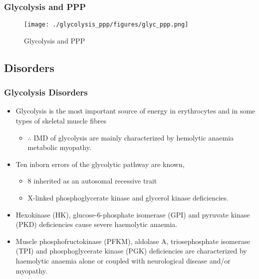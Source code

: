 \documentclass{scrartcl}
\begin{document}
\subsubsection{Glycolysis and PPP}
\label{sec:org0c6caa2}

\begin{figure}[htbp]
\centering
\texttt{[image: ./glycolysis\_ppp/figures/glyc\_ppp.png]}
\caption{\label{fig:org2af2e48}
Glycolysis and PPP}
\end{figure}

\subsection{Disorders}
\label{sec:org60636ff}
\subsubsection{Glycolysis Disorders}
\label{sec:org75d2a2a}
\begin{itemize}
\item Glycolysis is the most important source of energy in erythrocytes
and in some types of skeletal muscle fibres

\begin{itemize}
\item \(\therefore\) IMD of glycolysis are mainly characterized by hemolytic
anaemia \textpm{} metabolic myopathy.
\end{itemize}

\item Ten inborn errors of the glycolytic pathway are known,
\begin{itemize}
\item 8 inherited as an autosomal recessive trait
\item X-linked phosphoglycerate kinase and glycerol kinase deficiencies.
\end{itemize}

\item Hexokinase (HK), glucose-6-phosphate isomerase (GPI) and pyruvate
kinase (PKD) deficiencies cause severe haemolytic anaemia.

\item Muscle phosphofructokinase (PFKM), aldolase A, triosephosphate
isomerase (TPI) and phosphoglycerate kinase (PGK) deficiencies are
characterized by haemolytic anaemia alone or coupled with
neurological disease and/or myopathy.
\end{itemize}
\end{document}
